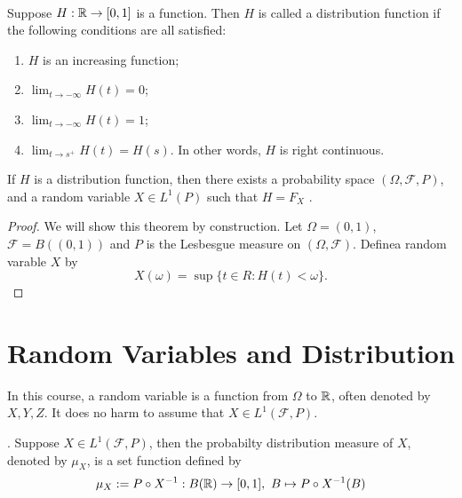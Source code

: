 \begin{definition} \ \\
Suppose $H:\mathbb{R} \to [0,1]$ is a function. Then $H$ is called a distribution function if the following conditions are all satisfied:
\begin{enumerate}
	\item $H$ is an increasing function;
	\item $\lim_{t \to -\infty}H(t)=0$;
	\item $\lim_{t \to -\infty}H(t)=1$;
	\item $\lim_{t \to s^+}H(t)=H(s)$. In other words, $H$ is right continuous.
\end{enumerate}
\end{definition}

\begin{theorem}
If $H$ is a distribution function, then there exists a probability space $(\Omega,\mathcal F,P)$, and a random variable $X \in L^1(P)$ such that $H=F_X$	.
\end{theorem}
\begin{proof}
We will show this theorem by construction. Let $\Omega=(0,1)$, $\mathcal F=B((0,1))$ and $P$ is the Lesbesgue measure on $(\Omega,\mathcal F)$. Definea random varable $X$ by
$$
X(\omega)= \sup \{t\in R: H(t)<\omega \}.
$$
\end{proof}






\section{Random Variables and Distribution}
In this course, a random variable is a function from $\Omega$ to $\mathbb{R}$, often denoted by $X,Y,Z$. It does no harm to assume that $X \in L^1(\mathcal F,P)$.
\begin{definition}.\label{PDM}
Suppose $X \in L^1(\mathcal F,P)$, then the probabilty distribution measure of $X$, denoted by $\mu_X$, is a set function defined by
$$
\mu_X := P \circ X^{-1}: B(\mathbb{R}) \to [0,1],\ B \mapsto P \circ X^{-1}(B)
$$
\end{definition}

